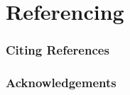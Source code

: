 \documentclass[en, 11pt, xcolor=dvipsnames]{beamer}
\begin{document}
\QApage


\section{Referencing}

\begin{frame}
	\frametitle{Citing References}

	\bigskip %

\end{frame}




\begin{frame}
	\frametitle{Acknowledgements}

	\begin{columns}[t] %
		\begin{column}{0.45\textwidth} %
		\end{column}
		\begin{column}{0.5\textwidth} %
		\end{column}
	\end{columns}
\end{frame}
\end{document}
